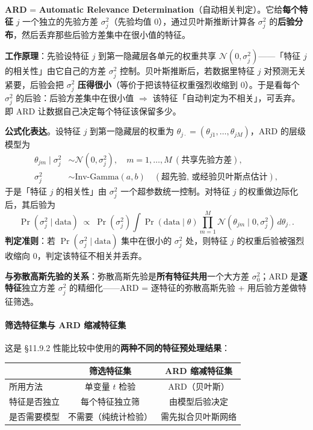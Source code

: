 \textbf{ARD} = \textbf{Automatic Relevance Determination}（自动相关判定）。它给\textbf{每个特征} $j$ 一个独立的先验方差 $\sigma_j^2$（先验均值 0），通过贝叶斯推断计算各 $\sigma_j^2$ 的\textbf{后验分布}，然后丢弃那些后验方差集中在很小值的特征。

\textbf{工作原理}：先验设特征 $j$ 到第一隐藏层各单元的权重共享 $\mathcal{N}(0,\sigma_j^2)$——「特征 $j$ 的相关性」由它自己的方差 $\sigma_j^2$ 控制。贝叶斯推断后，若数据里特征 $j$ 对预测无关紧要，后验会把 $\sigma_j^2$ \textbf{压得很小}（等价于把该特征权重强烈收缩到 0）。于是看每个 $\sigma_j^2$ 的后验：后验方差集中在很小值 $\Rightarrow$ 该特征「自动判定为不相关」，可丢弃。即 ARD 让数据自己决定每个特征该保留多少。

\textbf{公式化表达}。设特征 $j$ 到第一隐藏层的权重为 $\theta_{j\cdot}=(\theta_{j1},\dots,\theta_{jM})$，ARD 的层级模型为
\begin{align}
\theta_{jm} \mid \sigma_j^2 &\sim \mathcal{N}(0, \sigma_j^2), \quad m=1,\dots,M \ (\text{共享先验方差}), \nonumber \\
\sigma_j^2 &\sim \text{Inv-Gamma}(a, b) \quad (\text{超先验, 或经验贝叶斯点估计}), \label{eq:11_21a}
\end{align}
于是「特征 $j$ 的相关性」由 $\sigma_j^2$ 一个超参数统一控制。对特征 $j$ 的权重做边际化后，其后验为
\begin{equation}
\Pr(\sigma_j^2 \mid \text{data}) \;\propto\; \Pr(\sigma_j^2) \int \Pr(\text{data}\mid \theta) \prod_{m=1}^{M}\mathcal{N}(\theta_{jm}\mid 0,\sigma_j^2)\, d\theta_{j\cdot}. \label{eq:11_21b}
\end{equation}
\textbf{判定准则}：若 $\Pr(\sigma_j^2\mid \text{data})$ 集中在很小的 $\sigma_j^2$ 处，则特征 $j$ 的权重后验被强烈收缩向 0，判定该特征不相关并丢弃。

\textbf{与弥散高斯先验的关系}：弥散高斯先验是\textbf{所有特征共用}一个大方差 $\sigma_0^2$；ARD 是\textbf{逐特征}独立方差 $\sigma_j^2$ 的精细化——ARD = 逐特征的弥散高斯先验 + 用后验方差做特征筛选。

\paragraph{筛选特征集与 ARD 缩减特征集}

这是 §11.9.2 性能比较中使用的\textbf{两种不同的特征预处理结果}：

\begin{center}
\begin{tabular}{lcc}
\toprule
 & 筛选特征集 & ARD 缩减特征集 \\
\midrule
所用方法 & 单变量 $t$ 检验 & ARD（贝叶斯） \\
特征是否独立 & 每个特征独立筛 & 由模型后验决定 \\
是否需要模型 & 不需要（纯统计检验） & 需先拟合贝叶斯网络 \\
\bottomrule
\end{tabular}
\end{center}

